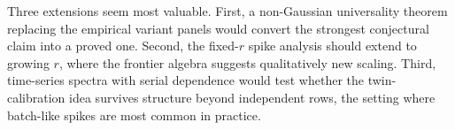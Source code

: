 Three extensions seem most valuable. First, a non-Gaussian universality theorem replacing the empirical variant panels would convert the strongest conjectural claim into a proved one. Second, the fixed-$r$ spike analysis should extend to growing $r$, where the frontier algebra suggests qualitatively new scaling. Third, time-series spectra with serial dependence would test whether the twin-calibration idea survives structure beyond independent rows, the setting where batch-like spikes are most common in practice.
